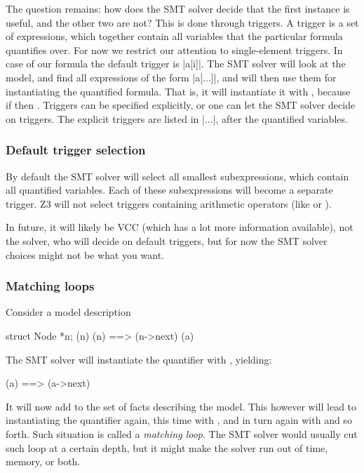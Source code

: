 The question remains: how does the SMT solver decide that the first
instance is useful, and the other two are not?
This is done through triggers.
A trigger is a set of expressions, which together contain all variables
that the particular formula quantifies over.
For now we restrict our attention to single-element triggers.
In case of our formula the default trigger is \vcc|{a[i]}|.
The SMT solver will look at the model, and find all expressions
of the form \vcc|a[...]|, and will then use them for instantiating
the quantified formula.
That is, it will instantiate it with , because
if  then .
Triggers can be specified explicitly, or one can let the SMT solver
decide on triggers.
The explicit triggers are listed in \vcc|{...}|, after the quantified variables.

\subsubsection{Default trigger selection}

By default the SMT solver will select all smallest subexpressions, which
contain all quantified variables.
Each of these subexpressions will become a separate trigger.
Z3 will not select triggers containing arithmetic operators (like \vcc{<}
or \vcc{+}).

In future, it will likely be VCC (which has a lot more information available),
not the solver, who will decide on default triggers, but for now the SMT solver
choices might not be what you want.

\subsubsection{Matching loops}

Consider a model description
\begin{VCC}
\forall struct Node *n; {\mine(n)} \mine(n) ==> \mine(n->next)
\mine(a)
\end{VCC}
The SMT solver will instantiate the quantifier with , yielding:
\begin{VCC}
\mine(a) ==> \mine(a->next)
\end{VCC}
It will now add  to the set of facts
describing the model.
This however will lead to instantiating the quantifier again,
this time with , and in turn again with
 and so forth.
Such situation is called a \emph{matching loop}.
The SMT solver would usually cut such loop at a certain depth,
but it might make the solver run out of time, memory, or both.

